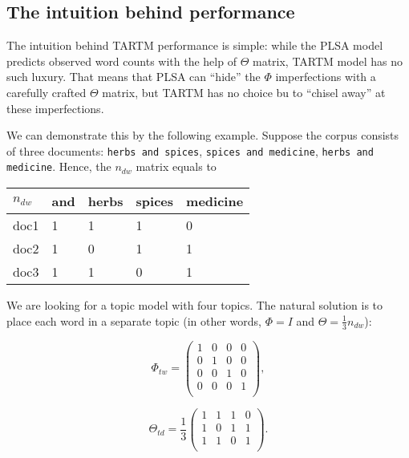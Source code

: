 \subsection{The intuition behind performance}
The intuition behind TARTM performance is simple: while the PLSA model predicts observed word counts with the help of $\Theta$ matrix, TARTM model has no such luxury. That means that PLSA can ``hide'' the $\Phi$ imperfections with a carefully crafted $\Theta$ matrix, but TARTM has no choice bu to ``chisel away'' at these imperfections.

\enlargethispage{1\baselineskip}

We can demonstrate this by the following example. Suppose the corpus consists of three documents: \texttt{herbs and spices}, \texttt{spices and medicine}, \texttt{herbs and medicine}. Hence, the $n_{dw}$ matrix equals to

\begin{center}
\begin{tabular}{l|llll}
$n_{dw}$   & and & herbs & spices & medicine \\ \hline
doc1       & 1   & 1     & 1      & 0        \\
doc2       & 1   & 0     & 1      & 1        \\
doc3       & 1   & 1     & 0      & 1       
\end{tabular}
\end{center}

We are looking for a topic model with four topics. The natural solution is to place each word in a separate topic (in other words, $\Phi = I$ and $\Theta = \frac{1}{3} n_{dw}$):
\begin{minipage}[t]{0.25\textwidth}
\[
\Phi_{tw} = 
\begin{pmatrix}
    1 & 0 & 0 & 0 \\
    0 & 1 & 0 & 0 \\
    0 & 0 & 1 & 0 \\
    0 & 0 & 0 & 1 \\
\end{pmatrix},
\]
\end{minipage}\begin{minipage}[t]{0.2\textwidth}
\[
\Theta_{td} = \frac{1}{3} 
\begin{pmatrix}
    1 & 1 & 1 & 0 \\
    1 & 0 & 1 & 1 \\
    1 & 1 & 0 & 1 \\
\end{pmatrix}.
\]
\end{minipage}

